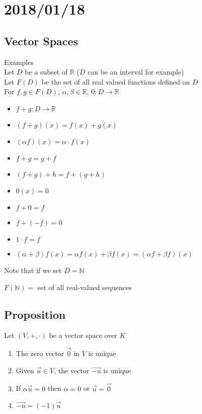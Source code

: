 \documentclass[12pt]{article}
\renewcommand{\v}[1]{\overrightarrow{#1}}
\newcommand{\real}[0]{\mathbb{R}}
\renewcommand{\natural}[0]{\mathbb{N}}
\begin{document}
	\section{2018/01/18}
	
	\subsection{Vector Spaces}
	
	Examples \\
	Let $D$ be a subset of $\real$ ($D$ can be an interval for example) \\
	Let $F(D)$ be the set of all real valued functions defined on $D$ \\
	For $f, g \in F(D)$, $\alpha, \beta \in \real$, $0 : D \rightarrow \real$
	
	\begin{itemize}
		\item $f + g : D \rightarrow \real$
		\item $(f + g)(x) = f(x) + g(x)$
		\item $(\alpha f)(x) = \alpha \cdot f(x)$
		\item $f + g = g + f$
		\item $(f + g) + h = f + (g + h)$
		\item $0(x) = 0$
		\item $f + 0 = f$
		\item $f + (-f) = 0$
		\item $1 \cdot f = f$
		\item $(\alpha + \beta) f(x) = \alpha f(x) + \beta f(x) = (\alpha f + \beta f)(x)$
	\end{itemize}
	
	Note that if we set $D = \natural$
	
	$F(\natural) =$ set of all real-valued sequences
	
	\subsection{Proposition}
	
	Let $(V, +, \cdot)$ be a vector space over $K$
	
	
	\begin{enumerate}
		\item The zero vector $\v{0}$ in $V$ is unique
		\item Given $\v{u} \in V$, the vector $\v{-u}$ is unique
		\item If $\alpha \v{u} = 0$ then $\alpha = 0$ or $\v{u} = \v{0}$
		\item $\v{-u} = (-1) \v{u}$
	\end{enumerate}
	
\end{document}
